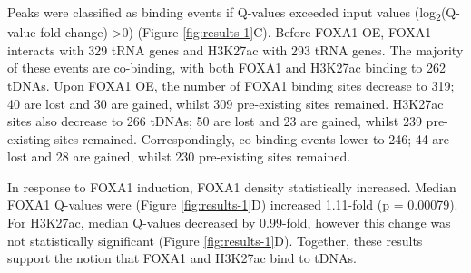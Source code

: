 \documentclass[
  12pt,
]{article}
\begin{document}
Peaks were classified as binding events if Q-values exceeded input values (log\textsubscript{2}(Q-value fold-change) \textgreater0) (Figure \ref{fig:results-1}C).
Before FOXA1 OE, FOXA1 interacts with 329 tRNA genes and H3K27ac with 293 tRNA genes.
The majority of these events are co-binding, with both FOXA1 and H3K27ac binding to 262 tDNAs.
Upon FOXA1 OE, the number of FOXA1 binding sites decrease to 319; 40 are lost and 30 are gained, whilst 309 pre-existing sites remained.
H3K27ac sites also decrease to 266 tDNAs; 50 are lost and 23 are gained, whilst 239 pre-existing sites remained.
Correspondingly, co-binding events lower to 246; 44 are lost and 28 are gained, whilst 230 pre-existing sites remained.

In response to FOXA1 induction, FOXA1 density statistically increased.
Median FOXA1 Q-values were (Figure \ref{fig:results-1}D) increased 1.11-fold (p = 0.00079).
For H3K27ac, median Q-values decreased by 0.99-fold, however this change was not statistically significant (Figure \ref{fig:results-1}D).
Together, these results support the notion that FOXA1 and H3K27ac bind to tDNAs.
\end{document}
